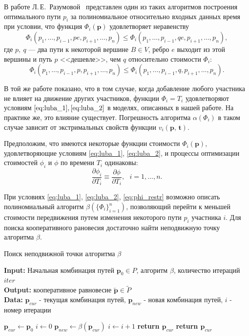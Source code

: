 \documentclass[12pt, a4paper]{article}
\begin{document}
В работе Л.\,Е.~Разумовой~\cite{Luba} представлен один из таких алгоритмов построения оптимального пути $p_i$ за полиномиальное относительно входных данных время при условии, что функция $\Phi_i (\textbf{p})$ удовлетворяет неравенству
\begin{equation}
	\label{eq:luba_1}
	\Phi_i (p_1, \ldots, p_{i - 1}, pe, p_{i + 1}, \ldots, p_n) \le 
	\Phi_i (p_1, \ldots, p_{i - 1}, qe, p_{i + 1}, \ldots, p_n),
\end{equation}
где $p, \: q$ --- два пути к некоторой вершине $B \in V$, ребро $e$ выходит из этой вершины и путь $p$ <<дешевле>>, чем $q$ относительно стоимости $\Phi_i$:
\begin{equation}
	\label{eq:luba_2}
	\Phi_i (p_1, \ldots, p_{i - 1}, p, p_{i + 1}, \ldots, p_n) \le
  	\Phi_i (p_1, \ldots, p_{i - 1}, q, p_{i + 1}, \ldots, p_n).
\end{equation}

В той же работе показано, что в том случае, когда добавление любого участника не влияет на движение других участников, функции $\Phi_i = T_i$ удовлетворяют условиям  $\eqref{eq:luba_1}, \eqref{eq:luba_2}$ в моделях, описанных в нашей работе. На практике же, это влияние существует. Погрешность алгоритма $\alpha (\Phi_i)$ в таком случае зависит от экстримальных свойств функции $v_i (\textbf{p, t})$.

Предположим, что имеются некоторые функции стоимости $\Phi_i (\textbf{p})$, удовлетворяющие условиям \eqref{eq:luba_1}, \eqref{eq:luba_2}, и процессы оптимизации стоимостей $\phi_i$ и $\phi$ по времени $T_i$ одинаковы:
\begin{equation}
	\label{eq:phi_restr}
	\frac{\partial \phi_i}{\partial T_i} \equiv \frac{\partial \phi}{\partial T_i}, \text{ } i = 1, \ldots, n.
\end{equation}

При условиях \eqref{eq:luba_1}, \eqref{eq:luba_2}, \eqref{eq:phi_restr} возможно описать полиномиальный алгоритм $\beta(\{\Phi_i\}_{i = 1}^n)$, позволяющий перейти к меньшей стоимости передвижения путем изменения некоторого пути  $p_i$ участника $i$. Для поиска кооперативного рановесия достаточно найти неподвижную точку алгоритма $\beta$. 

\begin{algorithm}[H]
	\caption{Поиск неподвижной точки алгоритма $\beta$}
	\label{alg:coop_find1}
	{\bf {Input:}} Начальная комбинация путей $\textbf{p}_0 \in P$, алгоритм $\beta$, количество итераций $iter$\\
	{\bf {Output:}} кооперативное равновесие $\widetilde{\textbf{p}} \in \widetilde{P}$\\
	{\bf {Data:}} $\textbf{p}_{cur}$ - текущая комбинация путей, $\textbf{p}_{new}$ - новая комбинация путей, $i$ - номер итерации
	\begin{algorithmic}[1]
		\State $\textbf{p}_{cur} \gets \textbf{p}_0$
		\State $i \gets 0$
		\State $\textbf{p}_{new} \gets \beta (\textbf{p}_{cur}) $
		\State $i \gets i + 1$
			\State \textbf{return $\textbf{p}_{cur}$}
		\EndIf
		\EndWhile
	\State \textbf{return $\textbf{p}_{cur}$}
	\end{algorithmic}
\end{algorithm}
\end{document}
